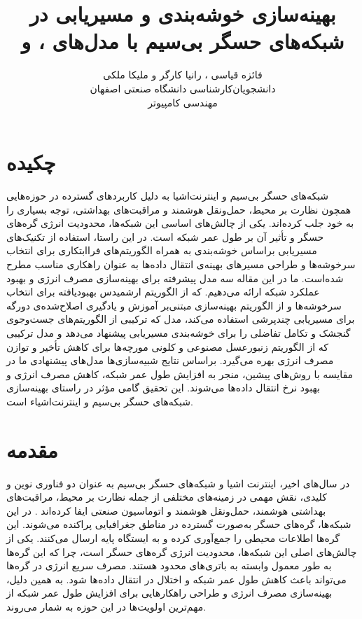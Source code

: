 \documentclass[11.5pt,onecolumn,a4paper]{article}
\begin{document}
	
	
	\title{بهینه‌سازی خوشه‌بندی و مسیر‌یابی در شبکه‌های حسگر بی‌سیم با مدل‌های ،  و } 
	\author{فائزه قیاسی ، رانیا کارگر و ملیکا ملکی\\
		دانشجویان‌کارشناسی دانشگاه صنعتی اصفهان\\
		مهندسی کامپیوتر}
	\date{}
	\maketitle
	\thispagestyle{empty}
	\section*{چکیده}
	شبکه‌های حسگر بی‌سیم و اینترنت‌اشیا به دلیل کاربردهای گسترده در حوزه‌هایی همچون نظارت بر محیط، حمل‌ونقل هوشمند و مراقبت‌های بهداشتی، توجه بسیاری را به خود جلب کرده‌اند. یکی از چالش‌های اساسی این شبکه‌ها، محدودیت انرژی گره‌های حسگر و تأثیر آن بر طول عمر شبکه است. در این راستا، استفاده از تکنیک‌های مسیریابی براساس خوشه‌بندی به‌ همراه الگوریتم‌های فراابتکاری برای انتخاب سرخوشه‌ها و طراحی مسیرهای بهینه‌ی انتقال داده‌ها به عنوان راهکاری مناسب مطرح شده‌است. ما در این مقاله سه مدل پیشرفته برای بهینه‌سازی مصرف انرژی و بهبود عملکرد شبکه ارائه می‌دهیم.  که از الگوریتم ارشمیدس بهبودیافته برای انتخاب سرخوشه‌ها و از الگوریتم بهینه‌سازی مبتنی‌بر آموزش و یادگیری اصلاح‌شده‌ی دورگه برای مسیریابی چندپرشی استفاده می‌کند، مدل  که ترکیبی از الگوریتم‌های جست‌وجوی گنجشک و تکامل تفاضلی را برای خوشه‌بندی مسیریابی پیشنهاد می‌دهد و مدل ترکیبی  که از الگوریتم زنبورعسل مصنوعی و کلونی مورچه‌ها برای کاهش تأخیر و توازن مصرف انرژی بهره می‌گیرد. براساس نتایج شبیه‌سازی‌ها مدل‌های پیشنهادی ما در مقایسه با روش‌های پیشین، منجر به افزایش طول عمر شبکه، کاهش مصرف انرژی و بهبود نرخ انتقال داده‌ها می‌شوند. این تحقیق گامی مؤثر در راستای بهینه‌سازی شبکه‌های حسگر بی‌سیم و اینترنت‌اشیاء است.
	\clearpage
	\newpage
	\section{مقدمه}
	\hspace*{1em}در سال‌های اخیر، اینترنت اشیا  و شبکه‌های حسگر بی‌سیم به عنوان دو فناوری نوین و کلیدی، نقش مهمی در زمینه‌های مختلفی از جمله نظارت بر محیط، مراقبت‌های بهداشتی هوشمند، حمل‌ونقل هوشمند و اتوماسیون صنعتی ایفا کرده‌اند \cite{ref1, ref2, ref3}. در این شبکه‌ها، گره‌های حسگر به‌صورت گسترده در مناطق جغرافیایی پراکنده می‌شوند. این گره‌ها اطلاعات محیطی را جمع‌آوری کرده و به ایستگاه‌ پایه ارسال می‌کنند. یکی از چالش‌های اصلی این شبکه‌ها، محدودیت انرژی گره‌های حسگر است، چرا که این گره‌ها به طور معمول وابسته به باتری‌های محدود هستند. مصرف سریع انرژی در گره‌ها می‌تواند باعث کاهش طول عمر شبکه و اختلال در انتقال داده‌ها شود. به همین دلیل، بهینه‌سازی مصرف انرژی و طراحی راهکارهایی برای افزایش طول عمر شبکه از مهم‌ترین اولویت‌ها در این حوزه به‌ شمار می‌روند.
	
\end{document}
